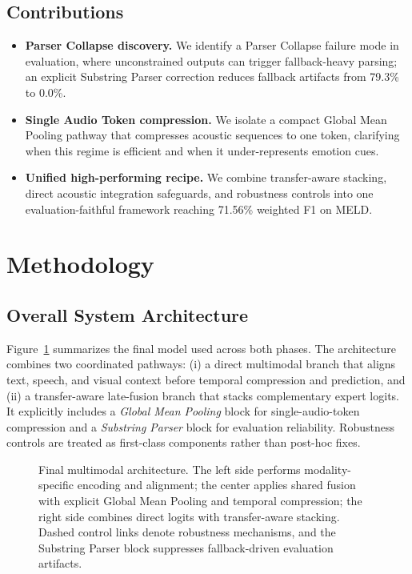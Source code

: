 \documentclass[11pt,a4paper,twocolumn]{article}
\begin{document}
\subsection*{Contributions}
\begin{itemize}
    \item \textbf{Parser Collapse discovery.} We identify a Parser Collapse failure mode in evaluation, where unconstrained outputs can trigger fallback-heavy parsing; an explicit Substring Parser correction reduces fallback artifacts from 79.3\% to 0.0\%.
    \item \textbf{Single Audio Token compression.} We isolate a compact Global Mean Pooling pathway that compresses acoustic sequences to one token, clarifying when this regime is efficient and when it under-represents emotion cues.
    \item \textbf{Unified high-performing recipe.} We combine transfer-aware stacking, direct acoustic integration safeguards, and robustness controls into one evaluation-faithful framework reaching 71.56\% weighted F1 on MELD.
\end{itemize}

\section{Methodology}

\subsection{Overall System Architecture}
Figure~\ref{fig:final_architecture} summarizes the final model used across both phases. The architecture combines two coordinated pathways: (i) a direct multimodal branch that aligns text, speech, and visual context before temporal compression and prediction, and (ii) a transfer-aware late-fusion branch that stacks complementary expert logits. It explicitly includes a \emph{Global Mean Pooling} block for single-audio-token compression and a \emph{Substring Parser} block for evaluation reliability. Robustness controls are treated as first-class components rather than post-hoc fixes.

\begin{figure}[htbp]
\centering
\resizebox{\textwidth}{!}{}
\caption{Final multimodal architecture. The left side performs modality-specific encoding and alignment; the center applies shared fusion with explicit Global Mean Pooling and temporal compression; the right side combines direct logits with transfer-aware stacking. Dashed control links denote robustness mechanisms, and the Substring Parser block suppresses fallback-driven evaluation artifacts.}
\label{fig:final_architecture}
\end{figure}
\end{document}

